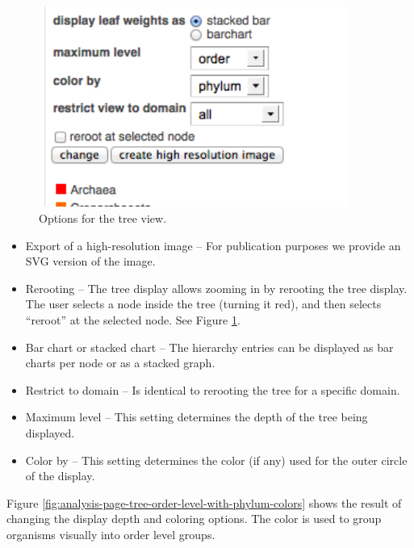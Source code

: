 \documentclass[12pt,fullpage]{report}
\begin{document}
\begin{figure}[ht]
\begin{center}
\includegraphics[width=4in]{Images/analysis-page-tree-options.png}
\end{center}
\caption{
Options for the tree view.
}
\label{fig:analysis-page-tree-options}
\end{figure}

\begin{itemize}

\item Export of a high-resolution image --
For publication purposes we provide an SVG version of the image.

\item Rerooting --
The tree display allows zooming in by rerooting the tree display. The user selects a node inside the tree (turning it red), and then selects ``reroot'' at the selected node. See Figure \ref{fig:analysis-page-tree-options}.

\item Bar chart or stacked chart --
The hierarchy entries can be displayed as bar charts per node or as a stacked graph.

\item Restrict to domain --
Is identical to rerooting the tree for a specific domain.

\item Maximum level --
This setting determines the depth of the tree being displayed.

\item Color by --
This setting determines the color (if any) used for the outer circle of the display.
\end{itemize}

Figure \ref{fig:analysis-page-tree-order-level-with-phylum-colors} shows the result of changing the display depth and coloring options. The color is used to group organisms visually into order level groups.
\end{document}
